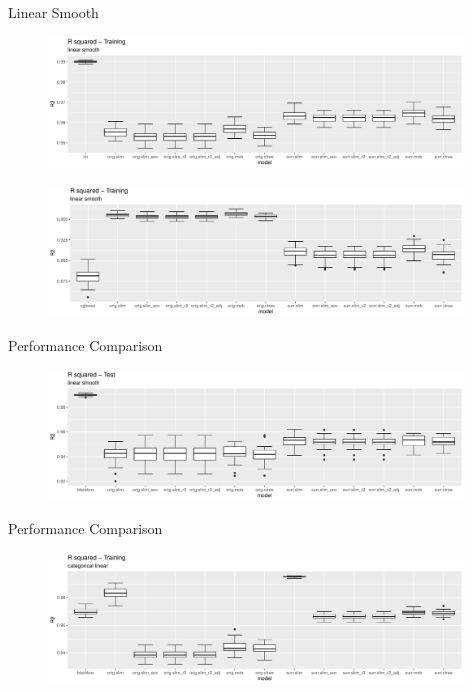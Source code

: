 \documentclass[9pt, xcolor=table]{beamer}
\begin{document}
\begin{frame}{Linear Smooth}
\begin{figure}
    \includegraphics[width=11cm]{Figures/Performance/linear_smooth/lm_r2_train.pdf}
\end{figure}
\begin{figure}
    \includegraphics[width=11cm]{Figures/Performance/linear_smooth/xgboost_r2_train.pdf}
\end{figure}
\end{frame}

\begin{frame}{Performance Comparison}
\begin{figure}
    \includegraphics[width=11cm]{Figures/Performance/linear_smooth/r2_test.pdf}
\end{figure}
\end{frame}

\begin{frame}{Performance Comparison}
\begin{figure}
    \includegraphics[width=11cm]{Figures/Performance/categorical_linear/r2_train.pdf}
\end{figure}
\end{frame}
\end{document}

